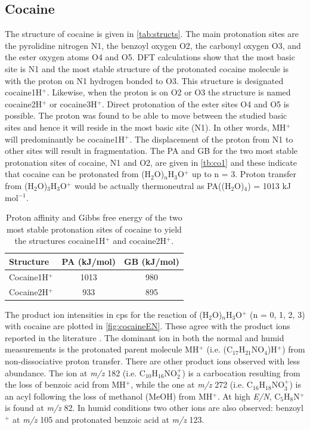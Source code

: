  
\subsection{Cocaine}
The structure of cocaine is given in \autoref{tab:structs}. The main protonation sites are the pyrolidine nitrogen N1, the benzoyl oxygen O2, the carbonyl oxygen O3, and the ester oxygen atoms O4 and O5.
%
DFT calculations show that the most basic site is N1 and the most stable structure of the protonated cocaine molecule is with the proton on N1 hydrogen bonded to O3. This structure is designated cocaine1H$^+$.
%
Likewise, when the proton is on O2 or O3 the structure is named cocaine2H$^+$ or cocaine3H$^+$.
%
Direct protonation of the ester sites O4 and O5 is possible.
%
The proton was found to be able to move between the studied basic sites and hence it will reside in the most basic site (N1).
In other words, MH$^+$ will predominantly be cocaine1H$^+$.
%
The displacement of the proton  from N1 to other sites  will result in fragmentation.
%
The PA and GB for the two most stable protonation sites of cocaine, N1 and O2, are given in \autoref{tb:co1} and these indicate that cocaine can be protonated from (H$_2$O)$_n$H$_3$O$^+$ up to n = 3.
Proton transfer from (H$_2$O)$_3$H$_3$O$^+$ would be actually thermoneutral as PA((H$_2$O)$_4$) = 1013 kJ mol$^{-1}$. 

\begin{table}[htbp]
\centering
\caption{Proton affinity and Gibbs free energy of the two most stable protonation sites of cocaine to yield the structures cocaine1H$^+$ and cocaine2H$^+$.}
\label{tb:co1}
\begin{tabular}{lcc}
\toprule
\textbf{Structure} &\textbf{PA (kJ/mol)} &\textbf{GB (kJ/mol)}\\ \toprule
Cocaine1H$^+$  & 1013 &   980    \\
Cocaine2H$^+$  & 933 &   895    \\
\bottomrule
\end{tabular}
\end{table}




The product ion intensities in cps for the reaction of (H$_2$O)$_n$H$_3$O$^+$ (n = 0, 1, 2, 3)  with cocaine are plotted in \autoref{fig:cocaineEN}.
%
These agree with the product ions reported in the literature \cite{Agarwal2011,wang1998collision}.
%
The dominant ion in both the normal and humid measurements is the protonated parent molecule MH$^+$ (i.e. (C$_{17}$H$_{21}$NO$_4$)H$^+$) from non-dissociative proton transfer. 
%
There are other product ions observed with less abundance.
%
The ion at \textit{m/z} 182 (i.e. C$_{10}$H$_{16}$NO$_2^+$) is a carbocation resulting from the loss of benzoic acid from MH$^+$, while the one at \textit{m/z} 272 (i.e. C$_{16}$H$_{18}$NO$_3^+$) is an acyl following the loss of methanol (MeOH) from  MH$^+$.
%
At high \textit{E/N}, C$_{5}$H$_{8}$N$^+$ is found at \textit{m/z} 82.
%
In humid conditions two other ions are also observed: benzoyl$^+$ at \textit{m/z} 105 and protonated benzoic acid at \textit{m/z} 123.
%



